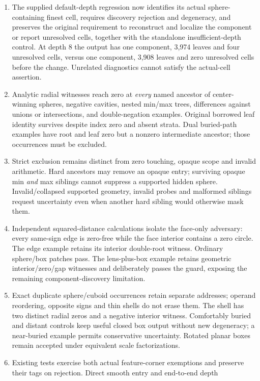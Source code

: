 \documentclass[11pt]{article}
\begin{document}
\begin{enumerate}[label=T\arabic*.]
\item The supplied default-depth regression now identifies its actual
sphere-containing finest cell, requires discovery rejection and degeneracy,
and preserves the original requirement to reconstruct and localize the
component or report unresolved cells, together with the standalone
insufficient-depth control. At depth 8 the output
has one component, 3,974 leaves and four unresolved cells, versus one component,
3,908 leaves and zero unresolved cells before the change. Unrelated diagnostics
cannot satisfy the actual-cell assertion.
\item Analytic radial witnesses reach zero at \emph{every} named ancestor of
center-winning spheres, negative cavities, nested min/max trees, differences
against unions or intersections, and double-negation examples. Original borrowed
leaf identity survives despite index zero and absent strata. Dual buried-path
examples have root and leaf zero but a nonzero intermediate ancestor; those
occurrences must be excluded.
\item Strict exclusion remains distinct from zero touching, opaque scope and
invalid arithmetic. Hard ancestors may remove an opaque entry; surviving
opaque min \emph{and} max siblings cannot suppress a supported hidden sphere.
Invalid/collapsed supported geometry, invalid probes and malformed siblings
request uncertainty even when another hard sibling would otherwise mask them.
\item Independent squared-distance calculations isolate the face-only
adversary: every same-sign edge is zero-free while the face interior contains
a zero circle. The edge example retains its interior double-root witness.
Ordinary sphere/box patches pass. The lens-plus-box example retains geometric
interior/zero/gap witnesses and deliberately passes the guard, exposing the
remaining component-discovery limitation.
\item Exact duplicate sphere/cuboid occurrences retain separate addresses;
operand reordering, opposite signs and thin shells do not erase them. The
shell has two distinct radial zeros and a negative interior witness.
Comfortably buried and distant controls keep useful closed box output without
new degeneracy; a near-buried example permits conservative uncertainty.
Rotated planar boxes remain accepted under equivalent scale factorizations.
\item Existing tests exercise both actual feature-corner exemptions and
preserve their tags on rejection. Direct smooth entry and end-to-end depth

\end{enumerate}
\end{document}
